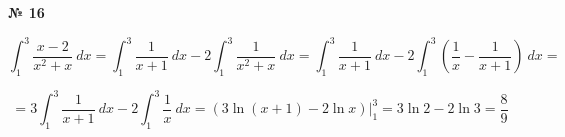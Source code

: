 \documentclass{article}
\begin{document}
\textbf{№ 16} 
\large

$$ \int_{1}^{3} \frac{x-2}{x^2+x} \ dx 
= \int_{1}^{3} \frac{1}{x+1} \ dx - 2 \int_{1}^{3} \frac{1}{x^2+x} \ dx
=  \int_{1}^{3} \frac{1}{x+1} \ dx - 2 \int_{1}^{3} \left( \frac{1}{x} - \frac{1}{x+1} \right) \ dx 
= $$

$$ = 3\int_{1}^{3} \frac{1}{x+1} \ dx - 2 \int_{1}^{3} \frac{1}{x} \ dx
= \left( 3\ln{(x+1)}  -2\ln{x} \right) \bigg\vert_{1}^{3}
= 3\ln{2} - 2 \ln{3}
= \frac{8}{9} $$
\end{document}
